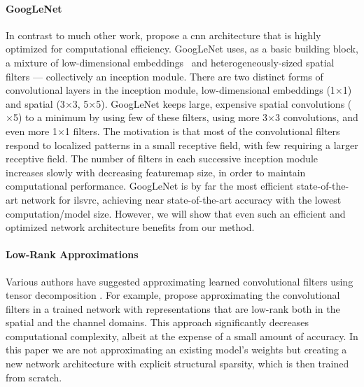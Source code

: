 \documentclass[thesis]{subfiles}
\begin{document}
	\paragraph{GoogLeNet} In contrast to much other work, \citet{Szegedy2014going} propose a \gls{cnn} architecture that is highly optimized for computational efficiency. GoogLeNet uses, as a basic building block, a mixture of low-dimensional embeddings~\citep{Lin2013NiN} and heterogeneously-sized spatial filters --- collectively an \Gls{inception} module. 
	There are two distinct forms of convolutional layers in the \gls{inception} module, low-dimensional embeddings (1$\times$1) and spatial (3$\times$3, 5$\times $5). GoogLeNet keeps large, expensive spatial convolutions ($\times$5) to a minimum by using few of these filters, using more 3$\times$3 convolutions, and even more 1$\times$1 filters. The motivation is that most of the convolutional filters respond to localized patterns in a small receptive field, with few requiring a larger receptive field. The number of filters in each successive \gls{inception} module increases slowly with decreasing \gls{featuremap} size, in order to maintain computational performance. GoogLeNet is by far the most efficient state-of-the-art network for \gls{ilsvrc}, achieving near state-of-the-art accuracy with the lowest computation/model size. However, we will show that even such an efficient and optimized network architecture benefits from our method.
	
	\paragraph{Low-Rank Approximations}
	Various authors have suggested approximating learned convolutional filters using tensor decomposition \citep{journals/corr/JaderbergVZ14,journals/corr/LebedevGROL14,Kim2016}. For example, \citet{journals/corr/JaderbergVZ14} propose approximating the convolutional filters in a trained network with representations that are low-rank both in the spatial and the channel domains. This approach significantly decreases computational complexity, albeit at the expense of a small amount of accuracy. In this paper we are not approximating an existing model's weights but creating a new network architecture with explicit structural sparsity, which is then trained from scratch.
	
\end{document}
